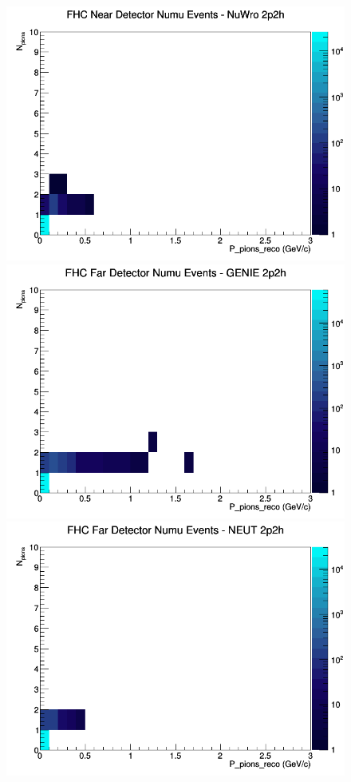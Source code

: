 \documentclass[12pt]{article}
\begin{document}
\begin{figure}[h]
\includegraphics[width=\linewidth]{eff_N_P/FGT/pions/2p2h_FHC_ND_numu_N_P_NuWro.png}
\endminipage
\newline
{}
\includegraphics[width=\linewidth]{eff_N_P/FGT/pions/2p2h_FHC_FD_numu_N_P_GENIE.png}
\endminipage
{}
\includegraphics[width=\linewidth]{eff_N_P/FGT/pions/2p2h_FHC_FD_numu_N_P_NEUT.png}

\end{figure}
\end{document}
